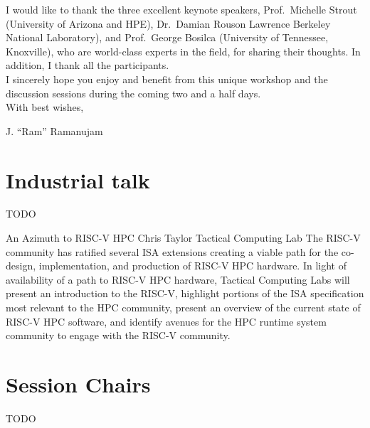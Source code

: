 \documentclass[12pt,letterpaper]{book}
\newenvironment{conf-abstract}[4][]{
 \needspace{10\baselineskip}
 \begin{center}
 { \renewcommand\textsuperscript[1]{}
 \phantomsection\addcontentsline{toc}{section}
 {\texorpdfstring{#2 (\emph{#3})}{#2 (#3)}}
 }
 {{\large\bfseries #2}\marginnote{#1}\par}
 \medskip
 {#3\par}
 \smallskip
 {\small #4\par}
 \end{center}
}{%
 \bigskip
 \hrule
 \bigskip
}
\begin{document}
\noindent I would like to thank the three excellent keynote speakers, Prof.\ Michelle Strout (University of Arizona and HPE), Dr.\ Damian Rouson Lawrence Berkeley National Laboratory), and Prof.\ George Bosilca (University of Tennessee, Knoxville), who are world-class experts in the field, for sharing their thoughts. In addition, I thank all the participants.\\

\noindent I sincerely hope you enjoy and benefit from this unique workshop and the discussion sessions during the coming two and a half days.\\

\noindent With best wishes,

J. “Ram” Ramanujam



%

\newpage



\tableofcontents

\mainmatter

\chapter{Industrial talk}

TODO

\begin{conf-abstract}[27$^{th}$]
{An Azimuth to RISC-V HPC}
{Chris Taylor}
{Tactical Computing Lab}
The RISC-V community has ratified several ISA extensions creating a viable path for the co-design, implementation, and production of RISC-V HPC hardware. In light of availability of a path to RISC-V HPC hardware, Tactical Computing Labs will present an introduction to the RISC-V, highlight portions of the ISA specification most relevant to the HPC community, present an overview of the current state of RISC-V HPC software,  and identify avenues for the HPC runtime system community to engage with the RISC-V community.
\end{conf-abstract}

\chapter{Session Chairs}

TODO
\end{document}
